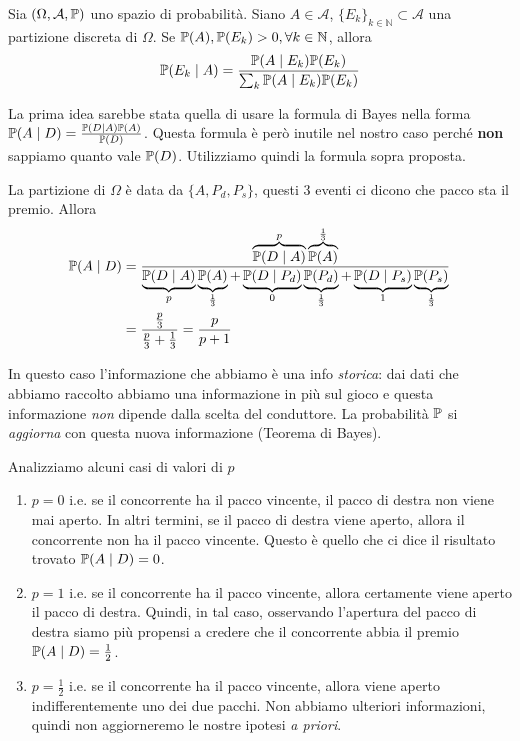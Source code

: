 \begin{enumerate}
\begin{theorem}
Sia $( \Omega ,\mathcal{A} ,\mathbb{P})$ uno spazio di probabilità. Siano $A\in \mathcal{A}$, $\{E_{k}\}_{k\in \mathbb{N}} \subset \mathcal{A}$ una partizione discreta di $\Omega $. Se $\mathbb{P}( A) ,\mathbb{P}( E_{k})  >0,\forall k\in \mathbb{N}$, allora
\begin{equation*}
\mathbb{P}( E_{k} \mid A) =\frac{\mathbb{P}( A\mid E_{k})\mathbb{P}( E_{k})}{\sum_{k}\mathbb{P}( A\mid E_{k})\mathbb{P}( E_{k})}
\end{equation*}
\end{theorem}

\begin{oss}
La prima idea sarebbe stata quella di usare la formula di Bayes nella forma $\mathbb{P}( A\mid D) =\frac{\mathbb{P}( D\mid A)\mathbb{P}( A)}{\mathbb{P}( D)}$. Questa formula è però inutile nel nostro caso perché \textbf{non} sappiamo quanto vale $\mathbb{P}( D)$. Utilizziamo quindi la formula sopra proposta.
\end{oss}

La partizione di $\Omega $ è data da $\{A,P_{d} ,P_{s}\}$, questi $3$ eventi ci dicono che pacco sta il premio. Allora\begin{equation*}
\begin{aligned}
\mathbb{P}( A\mid D) & =\frac{\overbrace{\mathbb{P}( D\mid A)}^{p}\overbrace{\mathbb{P}( A)}^{\frac{1}{3}}}{\underbrace{\mathbb{P}( D\mid A)}_{p}\underbrace{\mathbb{P}( A)}_{\frac{1}{3}} +\underbrace{\mathbb{P}( D\mid P_{d})}_{0}\underbrace{\mathbb{P}( P_{d})}_{\frac{1}{3}} +\underbrace{\mathbb{P}( D\mid P_{s})}_{1}\underbrace{\mathbb{P}( P_{s})}_{\frac{1}{3}}}\\
 & =\frac{\frac{p}{3}}{\frac{p}{3} +\frac{1}{3}} =\frac{p}{p+1}
\end{aligned}
\end{equation*}

\begin{oss}
In questo caso l'informazione che abbiamo è una info \textit{storica}: dai dati che abbiamo raccolto abbiamo una informazione in più sul gioco e questa informazione \textit{non} dipende dalla scelta del conduttore. La probabilità $\mathbb{P}$ si \textit{aggiorna} con questa nuova informazione (Teorema di Bayes).
\end{oss}

Analizziamo alcuni casi di valori di $p$
\begin{enumerate}
\item $\boxed{p=0}$ i.e. se il concorrente ha il pacco vincente, il pacco di destra non viene mai aperto. In altri termini, se il pacco di destra viene aperto, allora il concorrente non ha il pacco vincente. Questo è quello che ci dice il risultato trovato $\mathbb{P}( A\mid D) =0$.
\item $\boxed{p=1}$ i.e. se il concorrente ha il pacco vincente, allora certamente viene aperto il pacco di destra. Quindi, in tal caso, osservando l'apertura del pacco di destra siamo più propensi a credere che il concorrente abbia il premio $\mathbb{P}( A\mid D) =\frac{1}{2}$.
\item $\boxed{p=\frac{1}{2}}$ i.e. se il concorrente ha il pacco vincente, allora viene aperto indifferentemente uno dei due pacchi. Non abbiamo ulteriori informazioni, quindi non aggiorneremo le nostre ipotesi \textit{a priori}.
\end{enumerate}
\end{enumerate}
